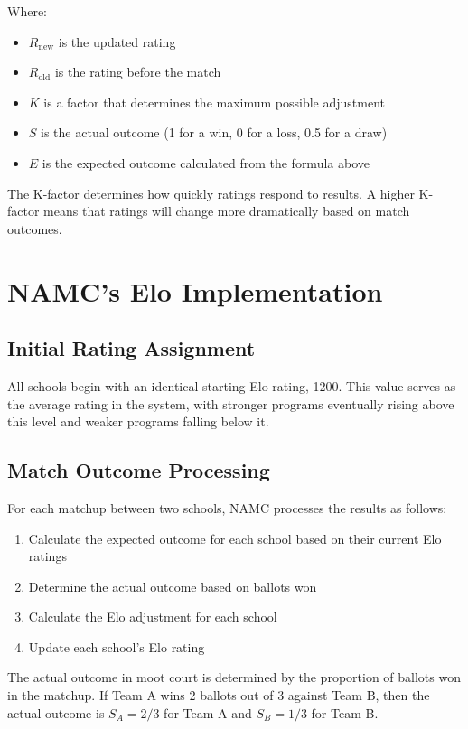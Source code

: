 \documentclass[11pt]{article}
\begin{document}
Where:
\begin{itemize}
    \item $R_{\text{new}}$ is the updated rating
    \item $R_{\text{old}}$ is the rating before the match
    \item $K$ is a factor that determines the maximum possible adjustment
    \item $S$ is the actual outcome (1 for a win, 0 for a loss, 0.5 for a draw)
    \item $E$ is the expected outcome calculated from the formula above
\end{itemize}

The K-factor determines how quickly ratings respond to results. A higher K-factor means that ratings will change more dramatically based on match outcomes.

\section{NAMC's Elo Implementation}

\subsection{Initial Rating Assignment}

All schools begin with an identical starting Elo rating, 1200. This value serves as the average rating in the system, with stronger programs eventually rising above this level and weaker programs falling below it.

\subsection{Match Outcome Processing}

For each matchup between two schools, NAMC processes the results as follows:

\begin{enumerate}
    \item Calculate the expected outcome for each school based on their current Elo ratings
    \item Determine the actual outcome based on ballots won
    \item Calculate the Elo adjustment for each school
    \item Update each school's Elo rating
\end{enumerate}

The actual outcome in moot court is determined by the proportion of ballots won in the matchup. If Team A wins 2 ballots out of 3 against Team B, then the actual outcome is $S_A = 2/3$ for Team A and $S_B = 1/3$ for Team B.
\end{document}
